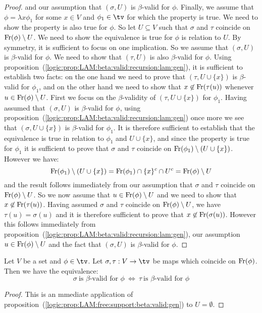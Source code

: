 \begin{proof}
    and our assumption that $(\sigma,U)$ is $\beta$-valid for $\phi$. Finally,
    we assume that $\phi=\lambda x\phi_{1}$ for some $x\in V$ and $\phi_{1}\in\tv$
    for which the property is true. We need to show the property is also true
    for $\phi$. So let $U\subseteq V$ such that $\sigma$ and $\tau$ coincide
    on $\mbox{\rm Fr}(\phi)\setminus U$. We need to show the equivalence is true for 
    $\phi$ is relation to $U$. By symmetry, it is sufficient to focus on one 
    implication. So we assume that $(\sigma,U)$ is $\beta$-valid for $\phi$.
    We need to show that $(\tau,U)$ is also $\beta$-valid for $\phi$. Using
    proposition~(\ref{logic:prop:LAM:beta:valid:recursion:lam:gen}), it is
    sufficient to establish two facts: on the one hand we need to prove
    that $(\tau, U\cup\{x\})$ is $\beta$-valid for $\phi_{1}$, and on the
    other hand we need to show that $x\not\in\mbox{\rm Fr}(\tau(u))$ whenever
    $u\in\mbox{\rm Fr}(\phi)\setminus U$. First we focus on the $\beta$-validity
    of $(\tau,U\cup\{x\})$ for $\phi_{1}$. Having assumed that $(\sigma,U)$
    is $\beta$-valid for $\phi$, using 
    proposition~(\ref{logic:prop:LAM:beta:valid:recursion:lam:gen}) once more
    we see that $(\sigma, U\cup\{x\})$ is $\beta$-valid for $\phi_{1}$.
    It is therefore sufficient to establish that the equivalence is true
    in relation to $\phi_{1}$ and $U\cup\{x\}$, and since the property is
    true for $\phi_{1}$ it is sufficient to prove that $\sigma$ and $\tau$
    coincide on $\mbox{\rm Fr}(\phi_{1})\setminus(U\cup\{x\})$. However we have:
        \[
            \mbox{\rm Fr}(\phi_{1})\setminus(U\cup\{x\})=
            \mbox{\rm Fr}(\phi_{1})\cap\{x\}^{c}\cap U^{c}=\mbox{\rm Fr}(\phi)\setminus U
        \]
    and the result follows immediately from our assumption that $\sigma$ 
    and $\tau$ coincide on $\mbox{\rm Fr}(\phi)\setminus U$. So we now assume that
    $u\in\mbox{\rm Fr}(\phi)\setminus U$ and we need to show that 
    $x\not\in\mbox{\rm Fr}(\tau(u))$. Having assumed $\sigma$ and $\tau$ coincide
    on $\mbox{\rm Fr}(\phi)\setminus U$, we have $\tau(u)=\sigma(u)$ and it is 
    therefore sufficient to prove that $x\not\in\mbox{\rm Fr}(\sigma(u))$. However
    this follows immediately from
    proposition~(\ref{logic:prop:LAM:beta:valid:recursion:lam:gen}), our
    assumption $u\in\mbox{\rm Fr}(\phi)\setminus U$ and the fact that $(\sigma,U)$
    is $\beta$-valid for $\phi$.
\end{proof}

\begin{prop}\label{logic:prop:LAM:free:support:beta:valid}
    Let $V$ be a set and $\phi\in\tv$. Let $\sigma,\tau:V\to\tv$ be maps which 
    coincide on $\mbox{\rm Fr}(\phi)$. Then we have the equivalence:
        \[
            \sigma\ \mbox{is $\beta$-valid for $\phi$}\ 
            \Leftrightarrow\
            \tau\ \mbox{is $\beta$-valid for $\phi$}
        \]
\end{prop}
\begin{proof}
    This is an mmediate application of 
    proposition~(\ref{logic:prop:LAM:free:support:beta:valid:gen})
    to $U=\emptyset$.
\end{proof}

